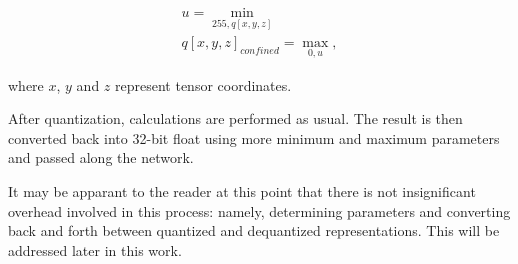 \begin{equation}
\label{eqn:clamp}
\begin{aligned}
u = \min_{255, q[x,y,z]}
\\
q[x,y,z]_{confined} = \max_{0, u},
\end{aligned}
\end{equation}

where $x$, $y$ and $z$ represent tensor coordinates.

After quantization, calculations are performed as usual. The result is then converted back into 32-bit float using more minimum and maximum parameters and passed along the network.

It may be apparant to the reader at this point that there is not insignificant overhead involved in this process: namely, determining parameters and converting back and forth between quantized and dequantized representations. This will be addressed later in this work.